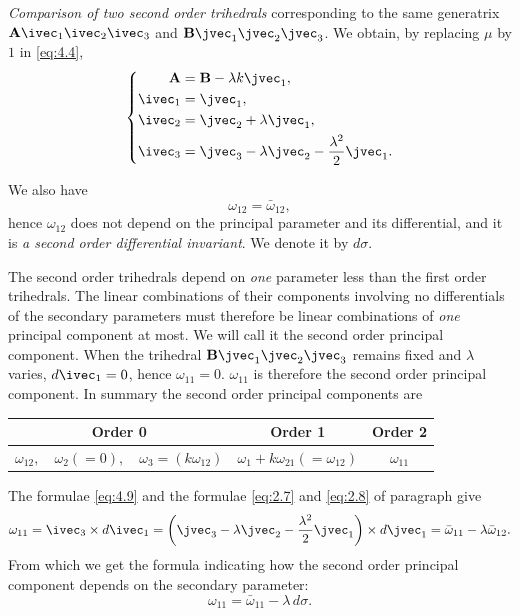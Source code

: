 \emph{Comparison of two second order trihedrals} corresponding to the same generatrix $\mathbf{A}\ivec_{1}\ivec_{2}\ivec_{3}$ and $\mathbf{B}\jvec_{1}\jvec_{2}\jvec_{3}$. We obtain, by replacing $\mu$ by $1$ in \eqref{eq:4.4},
\begin{equation}
  \label{eq:4.9}
  \left\{
    \begin{aligned}
      \mathbf{A}&=\mathbf{B}-\lambda k\jvec_{1},\\
      \ivec_{1}&=\jvec_{1},\\
      \ivec_{2}&=\jvec_{2}+\lambda\jvec_{1},\\
      \ivec_{3}&=\jvec_{3}-\lambda\jvec_{2}-\frac{\lambda^{2}}{2}\jvec_{1}.
    \end{aligned}
  \right.
\end{equation}

We also have
\[
\omega_{12}=\bar\omega_{12},
\]
hence $\omega_{12}$ does not depend on the principal parameter and its differential, and it is \emph{a second order differential invariant}. We denote it by $d\sigma$.

The second order trihedrals depend on \emph{one} parameter less than the first order trihedrals. The linear combinations of their components involving no differentials of the secondary parameters must therefore be linear combinations of \emph{one} principal component at most. We will call it the second order principal component. When the trihedral $\mathbf{B}\jvec_{1}\jvec_{2}\jvec_{3}$ remains fixed and $\lambda$ varies, $d\ivec_{1}=0$, hence $\omega_{11}=0$. $\omega_{11}$ is therefore the second order principal component. In summary the second order principal components are
\begin{center}
  \begin{tabular}{|c|c|c|}
    \hline
    Order 0&Order 1&Order 2\\
    \hline
    $\omega_{12},\quad\omega_{2}(=0),\quad\omega_{3}=(k\omega_{12})$&$\omega_{1}+k\omega_{21}(=\omega_{12})$&$\omega_{11}$\\
    \hline
  \end{tabular}
\end{center}

The formulae \eqref{eq:4.9} and the formulae \eqref{eq:2.7} and \eqref{eq:2.8} of paragraph  give
\[
\omega_{11}=\ivec_{3}\times d\ivec_{1}=\left(\jvec_{3}-\lambda\jvec_{2}-\frac{\lambda^{2}}{2}\jvec_{1}\right)\times d\jvec_{1}=\bar\omega_{11}-\lambda\bar\omega_{12}.
\]
From which we get the formula indicating how the second order principal component depends on the secondary parameter:
\begin{equation}
  \label{eq:4.10}
  \omega_{11}=\bar\omega_{11}-\lambda\,d\sigma.
\end{equation}

